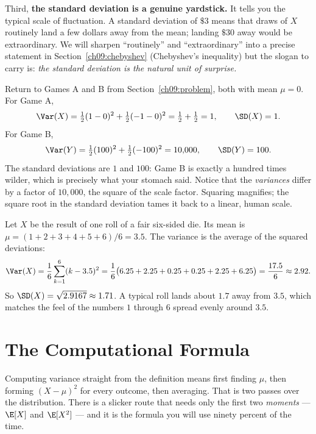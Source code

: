 Third, \textbf{the standard deviation is a genuine yardstick.} It tells you
the typical scale of fluctuation. A standard deviation of $\$3$ means that
draws of $X$ routinely land a few dollars away from the mean; landing
$\$30$ away would be extraordinary. We will sharpen ``routinely'' and
``extraordinary'' into a precise statement in Section~\ref{ch09:chebyshev}
(Chebyshev's inequality) but the slogan to carry is: \emph{the standard
deviation is the natural unit of surprise.}

\begin{example}
\label{ch09:ex-twogames}
Return to Games A and B from Section~\ref{ch09:problem}, both with mean
$\mu=0$.
For Game A,
\[
  \Var(X) = \tfrac12(1-0)^2 + \tfrac12(-1-0)^2 = \tfrac12 + \tfrac12 = 1,
  \qquad \SD(X) = 1.
\]
For Game B,
\[
  \Var(Y) = \tfrac12(100)^2 + \tfrac12(-100)^2 = 10{,}000,
  \qquad \SD(Y) = 100.
\]
The standard deviations are $1$ and $100$: Game B is exactly a hundred times
wilder, which is precisely what your stomach said. Notice that the
\emph{variances} differ by a factor of $10{,}000$, the square of the scale
factor. Squaring magnifies; the square root in the standard deviation tames
it back to a linear, human scale.
\end{example}

\begin{example}
\label{ch09:ex-die}
Let $X$ be the result of one roll of a fair six-sided die. Its mean is
$\mu = (1+2+3+4+5+6)/6 = 3.5$. The variance is the average of the squared
deviations:
\[
  \Var(X) = \frac{1}{6}\sum_{k=1}^{6}(k-3.5)^2
  = \frac{1}{6}\big(6.25+2.25+0.25+0.25+2.25+6.25\big)
  = \frac{17.5}{6} \approx 2.92.
\]
So $\SD(X) = \sqrt{2.9167} \approx 1.71$. A typical roll lands about $1.7$
away from $3.5$, which matches the feel of the numbers $1$ through $6$ spread
evenly around $3.5$.
\end{example}

\section{The Computational Formula}
\label{ch09:compformula}

Computing variance straight from the definition means first finding $\mu$,
then forming $(X-\mu)^2$ for every outcome, then averaging. That is two passes
over the distribution. There is a slicker route that needs only the first two
\emph{moments} --- $\E[X]$ and $\E[X^2]$ --- and it is the formula you will
use ninety percent of the time.

